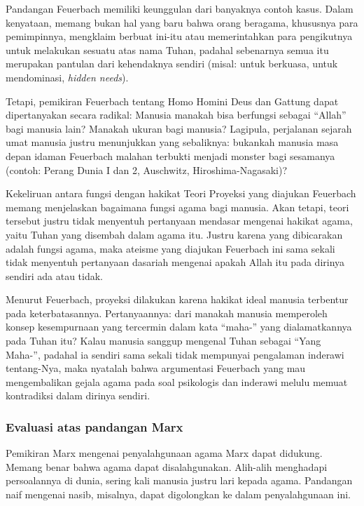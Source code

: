 \documentclass[11pt,twoside,a5paper,openany]{memoir}
\begin{document}
Pandangan Feuerbach memiliki keunggulan dari banyaknya contoh kasus.
Dalam kenyataan, memang bukan hal yang baru bahwa orang beragama,
khususnya para pemimpinnya, mengklaim berbuat ini-itu atau memerintahkan
para pengikutnya untuk melakukan sesuatu atas nama Tuhan, padahal
sebenarnya semua itu merupakan pantulan dari kehendaknya sendiri (misal:
untuk berkuasa, untuk mendominasi, \emph{hidden needs}).

Tetapi, pemikiran Feuerbach tentang Homo Homini Deus dan Gattung dapat
dipertanyakan secara radikal: Manusia manakah bisa berfungsi sebagai
``Allah'' bagi manusia lain? Manakah ukuran bagi manusia? Lagipula,
perjalanan sejarah umat manusia justru menunjukkan yang sebaliknya:
bukankah manusia masa depan idaman Feuerbach malahan terbukti menjadi
monster bagi sesamanya (contoh: Perang Dunia I dan 2, Auschwitz,
Hiroshima-Nagasaki)?

Kekeliruan antara fungsi dengan hakikat Teori Proyeksi yang diajukan
Feuerbach memang menjelaskan bagaimana fungsi agama bagi manusia. Akan
tetapi, teori tersebut justru tidak menyentuh pertanyaan mendasar
mengenai hakikat agama, yaitu Tuhan yang disembah dalam agama itu.
Justru karena yang dibicarakan adalah fungsi agama, maka ateisme yang
diajukan Feuerbach ini sama sekali tidak menyentuh pertanyaan dasariah
mengenai apakah Allah itu pada dirinya sendiri ada atau tidak.

Menurut Feuerbach, proyeksi dilakukan karena hakikat ideal manusia
terbentur pada keterbatasannya. Pertanyaannya: dari manakah manusia
memperoleh konsep kesempurnaan yang tercermin dalam kata ``maha-'' yang
dialamatkannya pada Tuhan itu? Kalau manusia sanggup mengenal Tuhan
sebagai ``Yang Maha-'', padahal ia sendiri sama sekali tidak mempunyai
pengalaman inderawi tentang-Nya, maka nyatalah bahwa argumentasi
Feuerbach yang mau mengembalikan gejala agama pada soal psikologis dan
inderawi melulu memuat kontradiksi dalam dirinya sendiri.

\hypertarget{evaluasi-atas-pandangan-marx}{%
\subsubsection{Evaluasi atas pandangan
Marx}\label{evaluasi-atas-pandangan-marx}}

Pemikiran Marx mengenai penyalahgunaan agama Marx dapat didukung. Memang
benar bahwa agama dapat disalahgunakan. Alih-alih menghadapi
persoalannya di dunia, sering kali manusia justru lari kepada agama.
Pandangan naif mengenai nasib, misalnya, dapat digolongkan ke dalam
penyalahgunaan ini.
\end{document}
